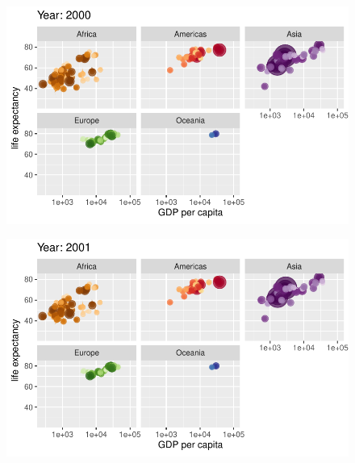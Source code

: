 \documentclass[
  letterpaper,
  DIV=11,
  numbers=noendperiod]{scrartcl}
\begin{document}
\begin{figure}[H]

{\centering \includegraphics{class05_files/figure-pdf/unnamed-chunk-24-88.pdf}

}

\end{figure}

\begin{figure}[H]

{\centering \includegraphics{class05_files/figure-pdf/unnamed-chunk-24-89.pdf}

}

\end{figure}
\end{document}
